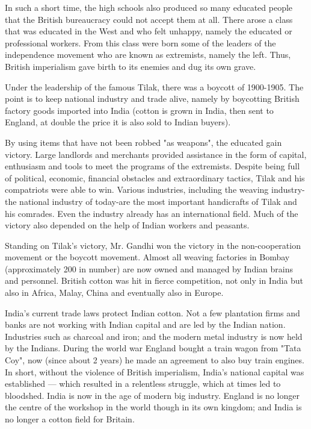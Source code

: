 In such a short time, the high schools also produced so many educated people that the British 
bureaucracy could not accept them at all. There arose a class that was educated in the West and 
who felt unhappy, namely the educated or professional workers. From this class were born some of 
the leaders of the independence movement who are known as extremists, namely the left. Thus, 
British imperialism gave birth to its enemies and dug its own grave.\nline

Under the leadership of the famous Tilak, there was a boycott of 1900-1905. 
The point is to keep national industry and trade alive, namely by boycotting 
British factory goods imported into India (cotton is grown in India, then sent 
to England, at double the price it is also sold to Indian buyers).\nline

By using items that have not been robbed "as weapons", the educated gain victory. 
Large landlords and merchants provided assistance in the form of capital, enthusiasm 
and tools to meet the programs of the extremists. Despite being full of political, 
economic, financial obstacles and extraordinary tactics, Tilak and his compatriots 
were able to win. Various industries, including the weaving industry-the national 
industry of today-are the most important handicrafts of Tilak and his comrades. 
Even the industry already has an international field. Much of the victory also depended on the help of Indian workers and peasants.\nline

Standing on Tilak's victory, Mr. Gandhi won the victory in the non-cooperation movement 
or the boycott movement. Almost all weaving factories in Bombay (approximately 200 in number) 
are now owned and managed by Indian brains and personnel. British cotton was hit in fierce 
competition, not only in India but also in Africa, Malay, China and eventually also in Europe.\nline

India's current trade laws protect Indian cotton. Not a few plantation firms and banks 
are not working with Indian capital and are led by the Indian nation. Industries such 
as charcoal and iron; and the modern metal industry is now held by the Indians. During 
the world war England bought a train wagon from "Tata Coy", now (since about 2 years) 
he made an agreement to also buy train engines. In short, without the violence of British 
imperialism, India's national capital was established — which resulted in a relentless 
struggle, which at times led to bloodshed. India is now in the age of modern big industry. 
England is no longer the centre of the workshop in the world though in its own kingdom; and 
India is no longer a cotton field for Britain.\nline

